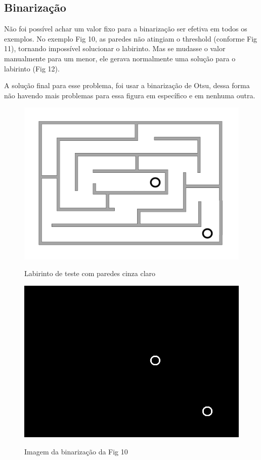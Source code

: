 \documentclass[conference]{IEEEtran}
\begin{document}
    \subsection{Binarização}
    Não foi possível achar um valor fixo para a binarização ser efetiva em todos os exemplos. No exemplo Fig 10, as paredes não atingiam o threshold (conforme Fig 11), tornando impossível solucionar o labirinto. Mas se mudasse o valor manualmente para um menor, ele gerava normalmente uma solução para o labirinto (Fig 12).

    A solução final para esse problema, foi usar a binarização de Otsu, dessa forma não havendo mais problemas para essa figura em específico e em nenhuma outra.

        \begin{figure}[h!]
          \centering
            \includegraphics[scale=0.3]{lab2.png}
            \label{fig:lab2}
            \caption{Labirinto de teste com paredes cinza claro}
        \end{figure}
        \begin{figure}[h!]
            \centering
            \includegraphics[scale=0.3]{edgeImagelab2.png}
            \label{fig:lab2Edge}
            \caption{Imagem da binarização da Fig 10}
        \end{figure}
\end{document}
